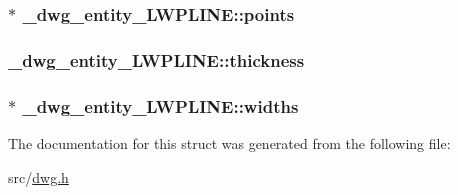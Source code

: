 \hypertarget{struct__dwg__entity__LWPLINE_a021ca945fc6fb2a426741ca3b3eed2c4}{
\subsubsection[{points}]{$\ast$ {\bf \-\_\-dwg\-\_\-entity\-\_\-\-L\-W\-P\-L\-I\-N\-E\-::points}}}\label{struct__dwg__entity__LWPLINE_a021ca945fc6fb2a426741ca3b3eed2c4}
\hypertarget{struct__dwg__entity__LWPLINE_a429d3ce64a992bb251a544fe4d668758}{
\subsubsection[{thickness}]{ {\bf \-\_\-dwg\-\_\-entity\-\_\-\-L\-W\-P\-L\-I\-N\-E\-::thickness}}}\label{struct__dwg__entity__LWPLINE_a429d3ce64a992bb251a544fe4d668758}
\hypertarget{struct__dwg__entity__LWPLINE_a637f66a9543e8b3f71dd9fff2cbe4560}{
\subsubsection[{widths}]{$\ast$ {\bf \-\_\-dwg\-\_\-entity\-\_\-\-L\-W\-P\-L\-I\-N\-E\-::widths}}}\label{struct__dwg__entity__LWPLINE_a637f66a9543e8b3f71dd9fff2cbe4560}


\-The documentation for this struct was generated from the following file\-:\begin{DoxyCompactItemize}
\item 
src/\hyperlink{dwg_8h}{dwg.\-h}\end{DoxyCompactItemize}
